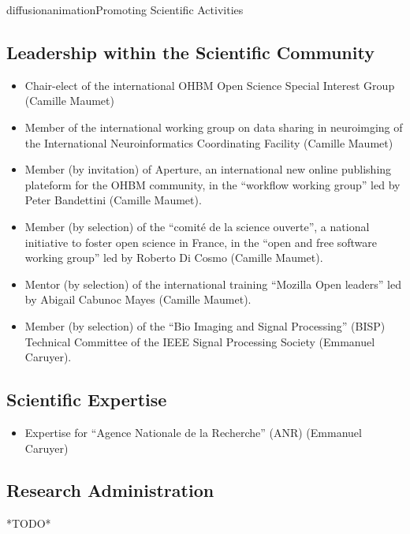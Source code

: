 \documentclass{ra2018}
\begin{document}
\begin{module}{diffusion}{animation}{Promoting Scientific Activities}
\subsection{Leadership within the Scientific Community}
\begin{itemize}
    \item Chair-elect of the international OHBM Open Science Special Interest Group (Camille Maumet)
    \item Member of the international working group on data sharing in neuroimging of the International Neuroinformatics Coordinating Facility (Camille Maumet)
    \item Member (by invitation) of Aperture, an international new online publishing plateform for the OHBM community, in the ``workflow working group'' led by Peter Bandettini  (Camille Maumet).
    \item Member (by selection) of the ``comité de la science ouverte'', a national initiative to foster open science in France, in the ``open and free software working group'' led by Roberto Di Cosmo  (Camille Maumet).
    \item Mentor (by selection) of the international training ``Mozilla Open leaders'' led by Abigail Cabunoc Mayes (Camille Maumet).
    \item Member (by selection) of the ``Bio Imaging and Signal Processing'' (BISP) Technical Committee of the IEEE Signal Processing Society (Emmanuel Caruyer).
\end{itemize}    
\subsection{Scientific Expertise}
\begin{itemize}
    \item Expertise for ``Agence Nationale de la Recherche'' (ANR) (Emmanuel Caruyer)
\end{itemize}

\subsection{Research Administration}
*TODO*
  
\end{module}
\end{document}
